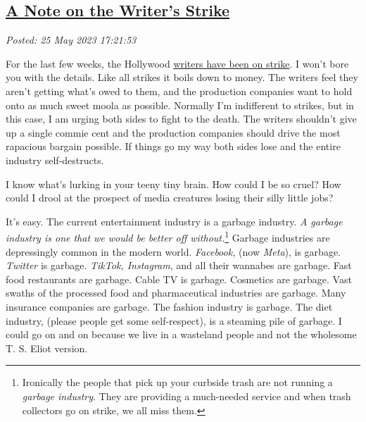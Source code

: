 %

\subsection*{\href{http://analyzethedatanotthedrivel.org/2023/05/25/a-note-on-the-writers-strike/}{A Note on the Writer's Strike}}


\noindent\emph{Posted: 25 May 2023 17:21:53}
\vspace{6pt}

For the last few weeks, the Hollywood
\href{https://parade.com/entertainment/2023-wga-writers-strike}{writers
have been on strike}. I won't bore you with the details. Like all
strikes it boils down to money. The writers feel they aren't getting
what's owed to them, and the production companies want to hold onto as
much sweet moola as possible. Normally I'm indifferent to strikes, but
in this case, I am urging both sides to fight to the death. The writers
shouldn't give up a single commie cent and the production companies
should drive the most rapacious bargain possible. If things go my way
both sides lose and the entire industry self-destructs.

I know what's lurking in your teeny tiny brain. How could I be so cruel?
How could I drool at the prospect of media creatures losing their silly
little jobs?

It's easy. The current entertainment industry is a garbage industry.
\emph{A garbage industry is one that we would be better off
without.}\footnote{Ironically the people that pick up your curbside trash are not running
  a \emph{garbage industry}. They are providing a much-needed service
  and when trash collectors go on strike, we all miss
  them.
}%
Garbage industries are depressingly common in the modern world.
\emph{Facebook,} (now \emph{Meta}), is garbage. \emph{Twitter} is
garbage. \emph{TikTok, Instagram}, and all their wannabes are garbage.
Fast food restaurants are garbage. Cable TV is garbage. Cosmetics are
garbage. Vast swaths of the processed food and pharmaceutical industries
are garbage. Many insurance companies are garbage. The fashion industry
is garbage. The diet industry, (please people get some self-respect), is
a steaming pile of garbage. I could go on and on because we live in a
wasteland people and not the wholesome T. S. Eliot version.


